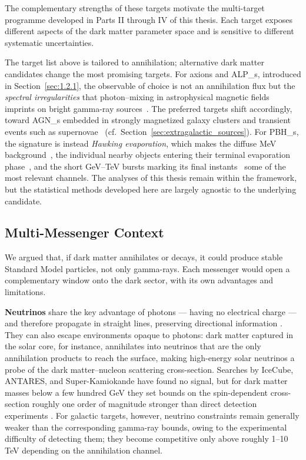 The complementary strengths of these targets motivate the multi-target programme developed in Parts II through IV of this thesis.
Each target exposes different aspects of the dark matter parameter space and is sensitive to different systematic uncertainties.

The target list above is tailored to \WIMP annihilation; alternative dark matter candidates change the most promising targets.
For axions and \glspl{ALP_}, introduced in Section~\ref{sec:1.2.1}, the observable of choice is not an annihilation flux but the \emph{spectral irregularities} that photon--\ALP mixing in astrophysical magnetic fields imprints on bright gamma-ray sources~\cite{Fermi-LAT:2016nkz}.
The preferred targets shift accordingly, toward \glspl{AGN_} embedded in strongly magnetized galaxy clusters and transient events such as supernovae~\cite{Payez:2014xsa} (cf.\ Section~\ref{sec:extragalactic_sources}).
For \glspl{PBH_}, the signature is instead \emph{Hawking evaporation}, which makes the diffuse MeV background~\cite{Ballesteros:2019exr}, the individual nearby objects entering their terminal evaporation phase~\cite{Fermi-LAT:2018pfs}, and the short GeV--TeV bursts marking its final instants~\cite{HAWC:2019wla} some of the most relevant channels.
The analyses of this thesis remain within the \WIMP framework, but the statistical methods developed here are largely agnostic to the underlying candidate.

\subsection{Multi-Messenger Context}
\label{sec:multi_messenger}

We argued that, if dark matter annihilates or decays, it could produce stable Standard Model particles, not only gamma-rays.
Each messenger would open a complementary window onto the dark sector, with its own advantages and limitations.

\textbf{Neutrinos} share the key advantage of photons --- having no electrical charge --- and therefore propagate in straight lines, preserving directional information \cite{Cirelli:2024ssz}.
They can also escape environments opaque to photons: dark matter captured in the solar core, for instance, annihilates into neutrinos that are the only annihilation products to reach the surface, making high-energy solar neutrinos a probe of the dark matter--nucleon scattering cross-section.
Searches by IceCube, ANTARES, and Super-Kamiokande have found no signal, but for dark matter masses below a few hundred GeV they set bounds on the spin-dependent cross-section roughly one order of magnitude stronger than direct detection experiments \cite{IceCube:2016dgk}.
For galactic targets, however, neutrino constraints remain generally weaker than the corresponding gamma-ray bounds, owing to the experimental difficulty of detecting them; they become competitive only above roughly 1--10 TeV depending on the annihilation channel.

